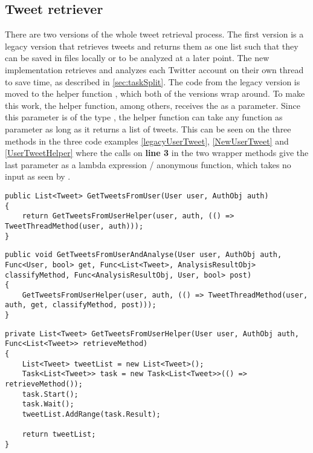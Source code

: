 \subsection{Tweet retriever} \label{sub:tweetretriever}
There are two versions of the whole tweet retrieval process. The first version
is a legacy version that retrieves tweets and returns them as one list such that
they can be saved in files locally or to be analyzed at a later point.
The new implementation retrieves and analyzes each Twitter account on their own
thread to save time, as described in \autoref{sec:taskSplit}. The code from the
legacy version is moved to the helper function ,
which both of the versions wrap around. To make this work, the helper function,
among others, receives the  as a parameter. Since this
parameter is of the type , the helper function can take
any function as parameter as long as it returns a list of tweets. This can be
seen on the three methods in the three code examples \autoref{legacyUserTweet},
\autoref{NewUserTweet} and \autoref{UserTweetHelper} where the calls on
\textbf{line 3} in the two wrapper methods give the last parameter as a lambda
expression / anonymous function, which takes no input as seen by \textc{()=>}.\\

\begin{minipage}[H]{\linewidth}
\begin{lstlisting}[caption = Legacy method call , label = legacyUserTweet ] 
public List<Tweet> GetTweetsFromUser(User user, AuthObj auth)
{	
    return GetTweetsFromUserHelper(user, auth, (() => TweetThreadMethod(user, auth)));
}
\end{lstlisting}
\end{minipage}

\begin{minipage}[H]{\linewidth}
\begin{lstlisting}[caption = Current method call to speed up execution , label =
NewUserTweet ] 
public void GetTweetsFromUserAndAnalyse(User user, AuthObj auth, Func<User, bool> get, Func<List<Tweet>, AnalysisResultObj> classifyMethod, Func<AnalysisResultObj, User, bool> post)
{
    GetTweetsFromUserHelper(user, auth, (() => TweetThreadMethod(user, auth, get, classifyMethod, post)));
}
\end{lstlisting}
\end{minipage}

\begin{minipage}[H]{\linewidth}
\begin{lstlisting}[caption = The GetTweetsFromUserHelper, label =
UserTweetHelper]
private List<Tweet> GetTweetsFromUserHelper(User user, AuthObj auth, Func<List<Tweet>> retrieveMethod)
{
    List<Tweet> tweetList = new List<Tweet>();
    Task<List<Tweet>> task = new Task<List<Tweet>>(() => retrieveMethod());
    task.Start();
    task.Wait();
    tweetList.AddRange(task.Result);

    return tweetList;
}
\end{lstlisting}
\end{minipage}

